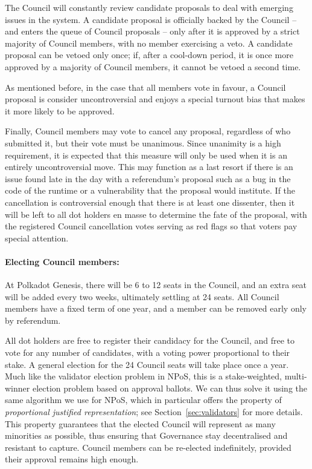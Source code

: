 The Council will constantly review candidate proposals to deal with emerging issues in the system. A candidate proposal is officially backed by the Council -- and enters the queue of Council proposals -- only after it is approved by a strict majority of Council members, with no member exercising a veto. A candidate proposal can be vetoed only once; if, after a cool-down period, it is once more approved by a majority of Council members, it cannot be vetoed a second time. 


As mentioned before, in the case that all members vote in favour, a Council proposal is consider uncontroversial and enjoys a special turnout bias that makes it more likely to be approved. 

Finally, Council members may vote to cancel any proposal, regardless of who submitted it, but their vote must be unanimous. Since unanimity is a high requirement, it is expected that this measure will only be used when it is an entirely uncontroversial move. This may function as a last resort if there is an issue found late in the day with a referendum's proposal such as a bug in the code of the runtime or a vulnerability  that the proposal would institute. If the cancellation is controversial enough that there is at least one dissenter, then it will be left to all dot holders en masse to determine the fate of the proposal, with the registered Council cancellation votes serving as red flags so that voters pay special attention.

\paragraph{Electing Council members:} At Polkadot Genesis, there will be 6 to 12 seats in the Council, and an extra seat will be added every two weeks, ultimately settling at 24 seats.  All Council members have a fixed term of one year, and a member can be removed early only by referendum. 

All dot holders are free to register their candidacy for the Council, and free to vote for any number of candidates, with a voting power proportional to their stake. A general election for the 24 Council seats will take place once a year. Much like the validator election problem in NPoS, this is a stake-weighted, multi-winner election problem based on approval ballots. We can thus solve it using the same algorithm we use for NPoS, which in particular offers the property of \emph{proportional justified representation}; see Section~\ref{sec:validators} for more details. This property guarantees that the elected Council will represent as many minorities as possible, thus ensuring that Governance stay decentralised and resistant to capture. Council members can be re-elected indefinitely, provided their approval remains high enough. 


